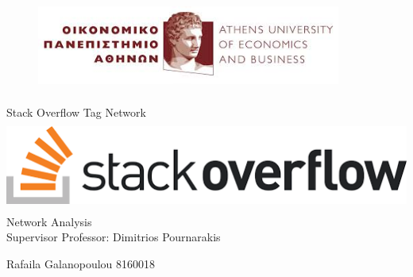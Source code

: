 \documentclass[12pt]{article}
\begin{document}
	
	\begin{titlepage}
		
		\begin{figure}[h!]
			\centering
			\includegraphics[width=10cm,height=3cm]{uni}
		\end{figure}
		
		\begin{center}
			\vspace*{0.2cm}

			\Large
			Stack Overflow Tag Network
			\vspace{0.5cm}
			\centering
			\includegraphics[width=15cm,height=3cm]{stackoverflowlogo}
			\vfill
			\Large
			Network Analysis\\
			Supervisor Professor: Dimitrios Pournarakis
			
			\vspace{1.5cm}
			
			\textbf \small {Rafaila Galanopoulou 8160018}
			
			\vspace{2.5cm}
			\centering
			
		\end{center}
	\end{titlepage}
	
	\clearpage
	\hypersetup{linkcolor=black}
	\tableofcontents
	\clearpage
\end{document}
